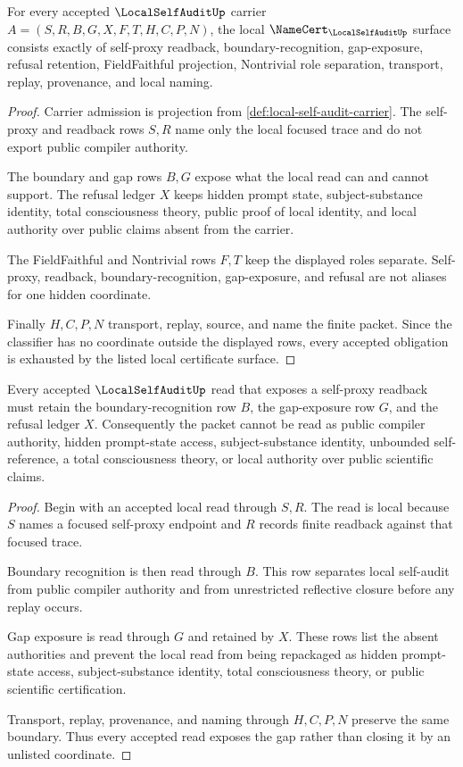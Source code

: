 \begin{theorem}
\label{thm:local-self-audit-namecert-obligations}
For every accepted $\LocalSelfAuditUp$ carrier $A=(S,R,B,G,X,F,T,H,C,P,N)$, the local $\NameCert_{\LocalSelfAuditUp}$ surface consists exactly of self-proxy readback, boundary-recognition, gap-exposure, refusal retention, FieldFaithful projection, Nontrivial role separation, transport, replay, provenance, and local naming.
\end{theorem}
\begin{proof}
Carrier admission is projection from \autoref{def:local-self-audit-carrier}. The self-proxy and readback rows $S,R$ name only the local focused trace and do not export public compiler authority.

The boundary and gap rows $B,G$ expose what the local read can and cannot support. The refusal ledger $X$ keeps hidden prompt state, subject-substance identity, total consciousness theory, public proof of local identity, and local authority over public claims absent from the carrier.

The FieldFaithful and Nontrivial rows $F,T$ keep the displayed roles separate. Self-proxy, readback, boundary-recognition, gap-exposure, and refusal are not aliases for one hidden coordinate.

Finally $H,C,P,N$ transport, replay, source, and name the finite packet. Since the classifier has no coordinate outside the displayed rows, every accepted obligation is exhausted by the listed local certificate surface.
\end{proof}

\begin{theorem}
\label{thm:local-self-audit-gap-exposure}
Every accepted $\LocalSelfAuditUp$ read that exposes a self-proxy readback must retain the boundary-recognition row $B$, the gap-exposure row $G$, and the refusal ledger $X$. Consequently the packet cannot be read as public compiler authority, hidden prompt-state access, subject-substance identity, unbounded self-reference, a total consciousness theory, or local authority over public scientific claims.
\end{theorem}
\begin{proof}
Begin with an accepted local read through $S,R$. The read is local because $S$ names a focused self-proxy endpoint and $R$ records finite readback against that focused trace.

Boundary recognition is then read through $B$. This row separates local self-audit from public compiler authority and from unrestricted reflective closure before any replay occurs.

Gap exposure is read through $G$ and retained by $X$. These rows list the absent authorities and prevent the local read from being repackaged as hidden prompt-state access, subject-substance identity, total consciousness theory, or public scientific certification.

Transport, replay, provenance, and naming through $H,C,P,N$ preserve the same boundary. Thus every accepted read exposes the gap rather than closing it by an unlisted coordinate.
\end{proof}


